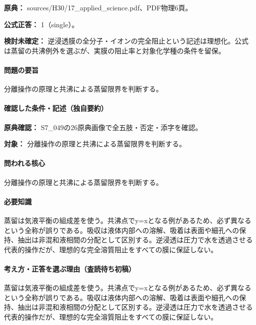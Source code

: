 \noindent\textbf{原典：} sources/H30/17\_applied\_science.pdf、PDF物理6頁。

\textbf{公式正答：} 1（single）。

\par\textbf{検討未確定：} 逆浸透膜の全分子・イオンの完全阻止という記述は理想化。公式は蒸留の共沸例外を選ぶが、実膜の阻止率と対象化学種の条件を留保。

\paragraph{問題の要旨} 分離操作の原理と共沸による蒸留限界を判断する。

\paragraph{確認した条件・記述（独自要約）}\mbox{}\par

\noindent\textbf{原典確認：} S7\_049の26原典画像で全五肢・否定・添字を確認。\par

\noindent\textbf{対象：} 分離操作の原理と共沸による蒸留限界を判断する。\par

\paragraph{問われる核心} 分離操作の原理と共沸による蒸留限界を判断する。

\paragraph{必要知識} 蒸留は気液平衡の組成差を使う。共沸点でy=\allowbreak{}xとなる例があるため、必ず異なるという全称が誤りである。吸収は液体内部への溶解、吸着は表面や細孔への保持、抽出は非混和液相間の分配として区別する。逆浸透は圧力で水を透過させる代表的操作だが、理想的な完全溶質阻止をすべての膜に保証しない。

\paragraph{考え方・正答を選ぶ理由（査読待ち初稿）} 蒸留は気液平衡の組成差を使う。共沸点でy=\allowbreak{}xとなる例があるため、必ず異なるという全称が誤りである。吸収は液体内部への溶解、吸着は表面や細孔への保持、抽出は非混和液相間の分配として区別する。逆浸透は圧力で水を透過させる代表的操作だが、理想的な完全溶質阻止をすべての膜に保証しない。

